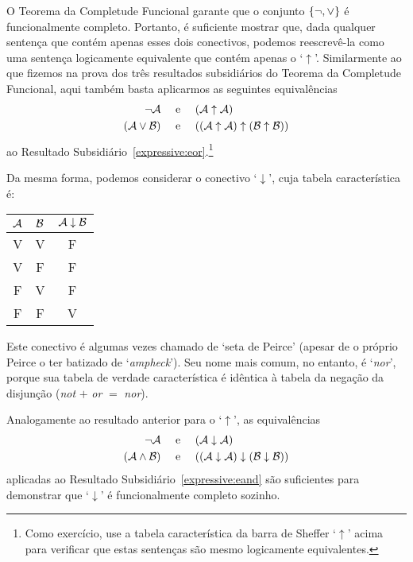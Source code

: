 O Teorema da Completude Funcional garante que o conjunto $\{\neg, \vee\}$ é funcionalmente completo.
Portanto, é suficiente mostrar que, dada qualquer sentença que contém apenas esses dois conectivos, podemos reescrevê-la como uma sentença logicamente equivalente que contém apenas o `$\uparrow$'.
Similarmente ao que fizemos na prova dos três resultados subsidiários do Teorema da Completude Funcional, aqui também basta aplicarmos as seguintes equivalências
		\begin{align*}
			\neg \mathcal{A} &\text{\quad \ e \quad} (\mathcal{A} \uparrow \mathcal{A})\\
			(\mathcal{A} \vee \mathcal{B}) & \text{\quad \ e \quad} ((\mathcal{A} \uparrow \mathcal{A}) \uparrow (\mathcal{B} \uparrow \mathcal{B}))
		\end{align*}
ao Resultado Subsidiário~\ref{expressive:eor}.\footnote{
	Como exercício, use a tabela característica da barra de Sheffer `$\uparrow$' acima para verificar que estas sentenças são mesmo logicamente equivalentes.}

Da mesma forma, podemos considerar o conectivo `$\downarrow$', cuja tabela característica é:
\begin{center}
\begin{tabular}{c c | c}
$\mathcal{A}$ & $\mathcal{B}$ & $\mathcal{A} \mathrel{\downarrow} \mathcal{B}$\\
\hline
 V & V & F \\
 V & F & F  \\
 F & V & F  \\
 F & F & V
\end{tabular}
\end{center}
Este conectivo é algumas vezes chamado de `seta de Peirce' (apesar de o próprio Peirce o ter batizado de `\emph{ampheck}').
Seu nome mais comum, no entanto, é `\emph{nor}', porque sua tabela de verdade característica é idêntica à tabela  da negação da disjunção (\emph{not} $+$ \emph{or} $=$ \emph{nor}).

Analogamente ao resultado anterior para o `$\uparrow$', as equivalências
		\begin{align*}
			\neg \mathcal{A} &\text{\quad \ e \quad} (\mathcal{A} \downarrow \mathcal{A})\\
			(\mathcal{A} \wedge \mathcal{B}) & \text{\quad \ e \quad} ((\mathcal{A} \downarrow \mathcal{A}) \downarrow (\mathcal{B} \downarrow \mathcal{B}))
		\end{align*}
aplicadas ao Resultado Subsidiário~\ref{expressive:eand} são suficientes para demonstrar que `$\downarrow$' é funcionalmente completo sozinho.


